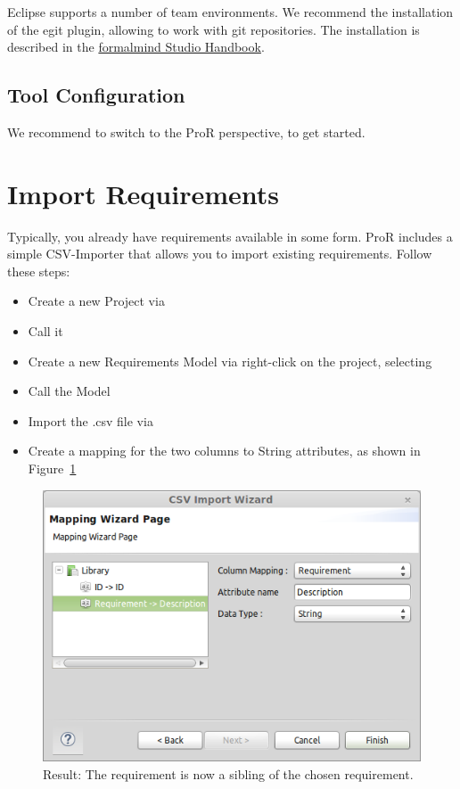 Eclipse supports a number of team environments.  We recommend the installation of the egit plugin, allowing to work with git repositories.  The installation is described in the \href{http://formalmind.com/handbook?page=sec-versioning.html}{formalmind Studio Handbook}.

\subsection{Tool Configuration}

We recommend to switch to the ProR perspective, to get started.

\section{Import Requirements}
\label{sec:tutorial-import}

Typically, you already have requirements available in some form.  ProR includes a simple CSV-Importer that allows you to import existing requirements.  Follow these steps:

\begin{itemize}
\item Create a new Project via 
\item Call it 
\item Create a new Requirements Model via right-click on the project, selecting 
\item Call the Model 
\item Import the .csv file via 
\item Create a mapping for the two columns to String attributes, as shown in Figure~\ref{fig:csv-import}
\end{itemize}

\begin{figure}[h!]
  \centering
  \includegraphics[width=0.8\linewidth]{../se-images/csv-import.png}
  \caption{Result: The requirement is now a sibling of the chosen requirement.}
  \label{fig:csv-import}
\end{figure}

